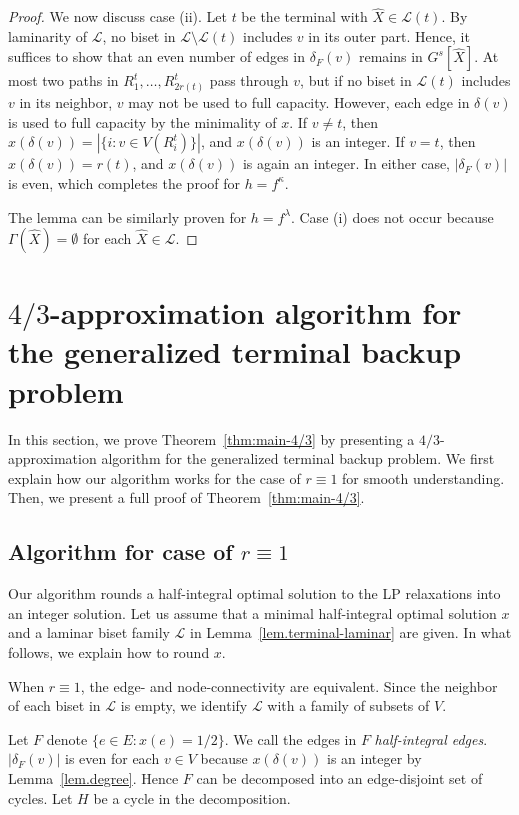 \documentclass{article}
\newcommand{\Lfam}{\mathcal{L}}
\newcommand{\f}{f^{\kappa}}
\newcommand{\g}{f^{\lambda}}
\begin{document}
\begin{proof}
We now discuss case (ii).
Let $t$ be the terminal with $\hat{X} \in \Lfam(t)$.
By laminarity of $\Lfam$, no biset 
in $\Lfam\setminus \Lfam(t)$ includes $v$ in its outer part. Hence, 
it suffices to show that an even number of edges in 
$\delta_F(v)$ remains in $G^s[\hat{X}]$.
At most two paths in $R^t_1,\ldots,R^t_{2r(t)}$ pass through $v$, but 
if no biset in $\Lfam(t)$ includes $v$ in its neighbor,
$v$ may not be used to full capacity.
However, each edge in $\delta(v)$ is used to full capacity by the minimality of $x$.
If $v \neq t$, then $x(\delta(v))= |\{i \colon v \in V(R^t_{i})\}|$, and $x(\delta(v))$
is an integer. If $v=t$, then $x(\delta(v))=r(t)$, and $x(\delta(v))$ is again an integer.
In either case, $|\delta_F(v)|$ is even, which completes the proof for $h=\f$.

The lemma can be similarly proven for $h=\g$.
Case (i) does not occur because $\Gamma(\hat{X})=\emptyset$
for each $\hat{X} \in \Lfam$.
 \end{proof}






\section{$4/3$-approximation algorithm for the generalized terminal backup problem}
\label{sec.algorithm}

In this section, we prove Theorem~\ref{thm:main-4/3} by presenting
a $4/3$-approximation algorithm for the generalized terminal backup
problem.
We first explain how our algorithm works for the case of $r\equiv 1$ 
for smooth understanding.
Then, we present a full proof of Theorem~\ref{thm:main-4/3}.


\subsection{Algorithm for case of $r\equiv 1$}


Our algorithm rounds a half-integral optimal solution to the LP
relaxations into an integer solution.
Let us assume that a minimal half-integral optimal solution $x$ and a
laminar biset family $\Lfam$ in Lemma~\ref{lem.terminal-laminar}
are given.
In what follows, we explain how to round $x$.

When $r\equiv 1$, the edge- and node-connectivity are equivalent.
Since the neighbor of each biset in $\Lfam$ is empty,
we identify $\Lfam$ with a family of subsets of $V$.

Let $F$ denote $\{e \in E \colon x(e)=1/2\}$.
We call the edges in $F$ \emph{half-integral edges}.
$|\delta_F(v)|$ is even for each $v \in V$
because $x(\delta(v))$ is an integer by Lemma~\ref{lem.degree}.
Hence $F$ can be decomposed into an edge-disjoint set of cycles.
Let $H$ be a cycle in the decomposition.
\end{document}
